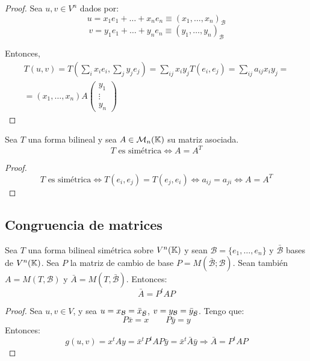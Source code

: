 \begin{proof}
    Sea $u,v \in V^n$ dados por:
    $$u=x_1e_1 + \dots + x_ne_n \equiv (x_1, \dots, x_n)_\mathcal{B}$$
    $$v=y_1e_1 + \dots + y_ne_n \equiv (y_1, \dots, y_n)_\mathcal{B}$$

    Entonces,
    \begin{multline*}
        T(u,v) = T\left(\sum_i x_ie_i , \sum_j y_je_j \right) = \sum_{ij}x_iy_jT(e_i,e_j) = \sum_{ij}a_{ij}x_iy_{j} =\\=
        (x_1, \dots, x_n)A\left(\begin{array}{c}
            y_1 \\ \vdots \\ y_n
        \end{array} \right)
    \end{multline*}
\end{proof}

\begin{lema}
    Sea $T$ una forma bilineal y sea $A\in \mathcal{M}_n(\mathbb{K})$ su matriz asociada.
    $$\text{$T$ es simétrica} \Longleftrightarrow A=A^T$$
\end{lema}
\begin{proof}
    $$\text{$T$ es simétrica} \Longleftrightarrow T(e_i,e_j) = T(e_j,e_i) \Longleftrightarrow a_{ij} = a_{ji} \Longleftrightarrow A=A^T$$
\end{proof}

\subsection{Congruencia de matrices}
\begin{teo}
    Sea $T$ una forma bilineal simétrica sobre $V^n(\mathbb{K})$ y sean $\mathcal{B}=\{e_1, \dots, e_n\}$ y $\bar{\mathcal{B}}$ bases de $V^n(\mathbb{K})$. Sea $P$ la matriz de cambio de base $P=M(\bar{\mathcal{B}};\mathcal{B})$. Sean también $A=M(T, \mathcal{B})$ y $\bar{A} = M(T, \bar{\mathcal{B}})$. Entonces:
$$\bar{A} = P^tAP$$
\end{teo}
\begin{proof}
    Sea $u,v\in V$, y sea $u=x_{\mathcal{B}}=\bar{x}_{\bar{\mathcal{B}}}$, $v=y_{\mathcal{B}}=\bar{y}_{\bar{\mathcal{B}}}$. Tengo que:
    \begin{equation*}
        P\bar{x}=x \qquad P\bar{y}=y
    \end{equation*}
    Entonces:
    \begin{equation*}
        g(u,v)=x^tAy = \bar{x}^tP^t{A}P\bar{y} = \bar{x}^t\bar{A}\bar{y}  \Longrightarrow \bar{A} = P^tAP
    \end{equation*}
\end{proof}

